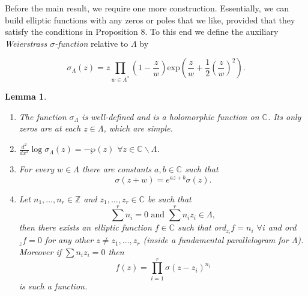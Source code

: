\documentclass{article}
\newtheorem*{lemma*}{Lemma}
\theoremstyle{remark}
\begin{document}
Before the main result, we require one more construction. Essentially, we can build elliptic functions with any zeros or poles that we like, provided that they satisfy the conditions in Proposition 8. To this end we define the auxiliary \textit{Weierstrass $\sigma$-function} relative to $\Lambda$ by

\[\sigma_\Lambda(z)=z\prod_{w\in\Lambda^*}\left(1-\frac{z}{w}\right)\text{exp}\left(\frac{z}{w}+\frac{1}{2}\left(\frac{z}{w}\right)^2\right). \]
\begin{lemma*}
\begin{enumerate}
\item The function $\sigma_\Lambda$ is well-defined and is a holomorphic function on $\mathbb{C}$. Its only zeros are at each $z\in\Lambda$, which are simple.
\item $\frac{d^2}{dx^2}\log \sigma_\Lambda(z)=-\wp(z)$ $\forall z\in\mathbb{C}\backslash\Lambda$.
\item For every $w\in\Lambda$ there are constants $a,b\in\mathbb{C}$ such that
\[ \sigma(z+w)=e^{az+b}\sigma(z).  \]
\item Let $n_1,\ldots, n_r\in\mathbb{Z}$ and $z_1,\ldots,z_r\in\mathbb{C}$ be such that 
\[ \sum^r n_i=0\text{ and }\sum^r n_iz_i\in\Lambda,\]
then there exists an elliptic function $f\in\mathbb{C}$ such that ord$_{z_i} f=n_i$ $\forall i$ and ord$_{z}f=0$ for any other $z\neq z_1,\ldots,z_r$ (inside a fundamental parallelogram for $\Lambda$). Moreover if $\sum n_iz_i=0$ then
\[ f(z)=\prod_{i=1} ^r \sigma(z-z_i)^{n_i} \]
is such a function.
\end{enumerate}
\end{lemma*}
\end{document}

